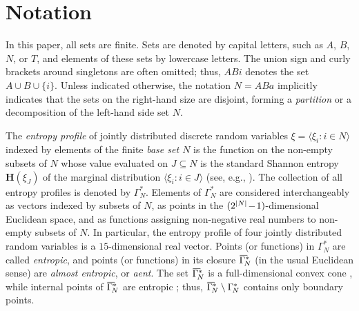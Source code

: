 \documentclass[a4paper]{IEEEtran}
\let\>\rangle\let\<\langle
\def\H{\mathbf H}
\def\m#1{\mskip 1.5mu{#1}\mskip 1.5mu}
\def\<{\langle}\def\>{\rangle}
\def\Ga#1{\Gamma^*_{\!#1}}
\def\barGamma{\mkern1mu\overline{\hbox{$\mkern-1mu\Gamma\mkern4mu$}}\mkern-4mu}
\def\clGa#1{\barGamma^*_{\!#1}}
\theoremstyle{definition}
\begin{document}

\section{Notation}\label{sec:defs}

In this paper, all sets are finite. Sets are denoted by capital letters,
such as $A$, $B$, $N$, or $T$, and elements of these sets by lowercase
letters. The union sign and curly brackets around singletons are often
omitted; thus, $ABi$ denotes the set $A\cup B\cup\{i\}$. Unless indicated
otherwise, the notation $N=ABa$ implicitly indicates that the sets on the
right-hand size are disjoint, forming a \emph{partition} or a decomposition
of the left-hand side set $N$.

The \emph{entropy profile} of jointly distributed discrete random variables
$\xi =\<\xi_i:i\in N\>$ indexed by elements of the finite \emph{base set
$N$} is the function on the non-empty subsets of $N$ whose value evaluated
on $J\subseteq N$ is the standard Shannon entropy $\H(\xi_J)$ of the
marginal distribution $\<\xi_i:i\in J\>$ (see, e.g., \cite{yeung-book}). The
collection of all entropy profiles is denoted by $\Ga N$. Elements of $\Ga
N$ are considered interchangeably as vectors indexed by subsets of $N$, as
points in the $(2^{|N|}\m-1)$-dimensional Euclidean space, and as
functions assigning non-negative real numbers to non-empty subsets of $N$.
In particular, the entropy profile of four jointly distributed random
variables is a $15$-dimensional real vector. Points (or functions) in $\Ga
N$ are called \emph{entropic}, and points (or functions) in its closure
$\clGa N$ (in the usual Euclidean sense) are \emph{almost entropic}, or
\emph{aent}. The set $\clGa N$ is a full-dimensional convex cone
\cite{yeung-book}, while internal points of $\clGa N$ are entropic
\cite{fmtwocon}; thus, $\clGa N\setminus \Ga N$ contains only boundary
points.
\end{document}
